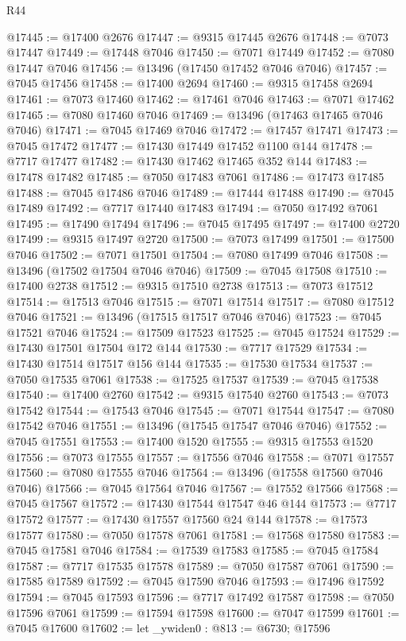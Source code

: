 \begin{lexlean}{R44}
\begin{coremodule}
{@17445 := @17400 @2676
@17447 := @9315 @17445 @2676
@17448 := @7073 @17447
@17449 := @17448 @7046
@17450 := @7071 @17449
@17452 := @7080 @17447 @7046
@17456 := @13496 (@17450 @17452 @7046 @7046)
@17457 := @7045 @17456
@17458 := @17400 @2694
@17460 := @9315 @17458 @2694
@17461 := @7073 @17460
@17462 := @17461 @7046
@17463 := @7071 @17462
@17465 := @7080 @17460 @7046
@17469 := @13496 (@17463 @17465 @7046 @7046)
@17471 := @7045 @17469 @7046
@17472 := @17457 @17471
@17473 := @7045 @17472
@17477 := @17430 @17449 @17452 @1100 @144
@17478 := @7717 @17477
@17482 := @17430 @17462 @17465 @352 @144
@17483 := @17478 @17482
@17485 := @7050 @17483 @7061
@17486 := @17473 @17485
@17488 := @7045 @17486 @7046
@17489 := @17444 @17488
@17490 := @7045 @17489
@17492 := @7717 @17440 @17483
@17494 := @7050 @17492 @7061
@17495 := @17490 @17494
@17496 := @7045 @17495
@17497 := @17400 @2720
@17499 := @9315 @17497 @2720
@17500 := @7073 @17499
@17501 := @17500 @7046
@17502 := @7071 @17501
@17504 := @7080 @17499 @7046
@17508 := @13496 (@17502 @17504 @7046 @7046)
@17509 := @7045 @17508
@17510 := @17400 @2738
@17512 := @9315 @17510 @2738
@17513 := @7073 @17512
@17514 := @17513 @7046
@17515 := @7071 @17514
@17517 := @7080 @17512 @7046
@17521 := @13496 (@17515 @17517 @7046 @7046)
@17523 := @7045 @17521 @7046
@17524 := @17509 @17523
@17525 := @7045 @17524
@17529 := @17430 @17501 @17504 @172 @144
@17530 := @7717 @17529
@17534 := @17430 @17514 @17517 @156 @144
@17535 := @17530 @17534
@17537 := @7050 @17535 @7061
@17538 := @17525 @17537
@17539 := @7045 @17538
@17540 := @17400 @2760
@17542 := @9315 @17540 @2760
@17543 := @7073 @17542
@17544 := @17543 @7046
@17545 := @7071 @17544
@17547 := @7080 @17542 @7046
@17551 := @13496 (@17545 @17547 @7046 @7046)
@17552 := @7045 @17551
@17553 := @17400 @1520
@17555 := @9315 @17553 @1520
@17556 := @7073 @17555
@17557 := @17556 @7046
@17558 := @7071 @17557
@17560 := @7080 @17555 @7046
@17564 := @13496 (@17558 @17560 @7046 @7046)
@17566 := @7045 @17564 @7046
@17567 := @17552 @17566
@17568 := @7045 @17567
@17572 := @17430 @17544 @17547 @46 @144
@17573 := @7717 @17572
@17577 := @17430 @17557 @17560 @24 @144
@17578 := @17573 @17577
@17580 := @7050 @17578 @7061
@17581 := @17568 @17580
@17583 := @7045 @17581 @7046
@17584 := @17539 @17583
@17585 := @7045 @17584
@17587 := @7717 @17535 @17578
@17589 := @7050 @17587 @7061
@17590 := @17585 @17589
@17592 := @7045 @17590 @7046
@17593 := @17496 @17592
@17594 := @7045 @17593
@17596 := @7717 @17492 @17587
@17598 := @7050 @17596 @7061
@17599 := @17594 @17598
@17600 := @7047 @17599
@17601 := @7045 @17600
@17602 := let _ywiden0 : @813 := @6730; @17596
}
\end{coremodule}
\end{lexlean}
